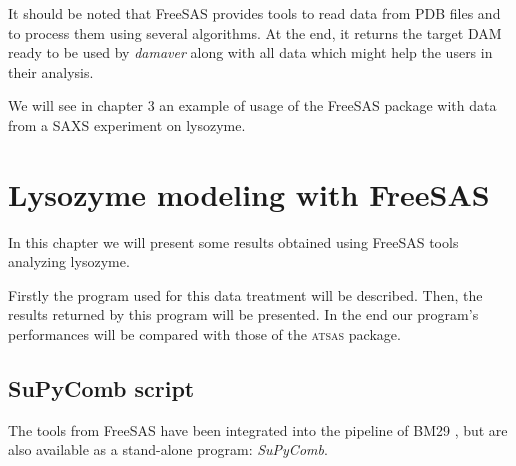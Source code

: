 \documentclass[a4paper, 11pt]{report}
\begin{document}
It should be noted that FreeSAS provides tools to read data from PDB 
files and to process them using several algorithms. 
At the end, it returns the target DAM ready to be used by 
\textit{damaver} along with all data which might help the users in 
their analysis.

We will see in chapter 3 an example of usage of the FreeSAS package 
with data from a SAXS experiment on lysozyme.


\chapter{Lysozyme modeling with FreeSAS}%

In this chapter we will present some results obtained using FreeSAS 
tools analyzing lysozyme.

Firstly the program used for this data treatment will be described. 
Then, the results returned by this program will be presented. 
In the end our program's performances will be compared with those of 
the \textsc{atsas} package.

\section{SuPyComb script}

The tools from FreeSAS have been integrated into the pipeline of BM29 
\cite{BM29news}, but are also available as a stand-alone program: 
\textit{SuPyComb}.\\
\end{document}
